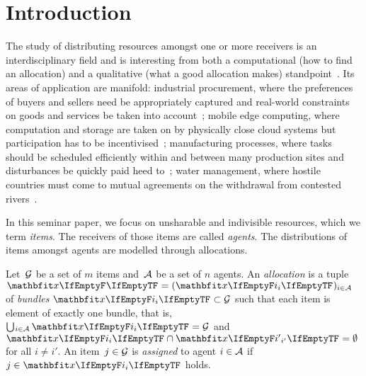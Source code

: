 \section{Introduction}
\label{sec:intro}

The study of distributing resources amongst one or more receivers is an interdisciplinary field and is interesting from both a computational (how to find an allocation) and a qualitative (what a good allocation makes) standpoint~\cite{survey}.
Its areas of application are mani\-fold:
industrial procurement, where the preferences of buyers and sellers need be appropriately captured and real-world constraints on goods and services be taken into account~\cite{survey};
mobile edge computing, where computation and storage are taken on by physically close cloud systems but participation has to be incentivised~\cite{edge_computing_auction, edge_computing_report};
manufacturing processes, where tasks should be scheduled efficiently within and between many production sites and disturbances be quickly paid heed to~\cite{survey};
water management, where hostile countries must come to mutual agreements on the withdrawal from contested rivers~\cite{water_management}.

In this seminar paper, we focus on unsharable and indivisible resources, which we term \emph{items}.
The receivers of those items are called \emph{agents}.
The distributions of items amongst agents are modelled through allocations.
\begin{definition}
	Let~\(\mathcal{G}\) be a set of \(m\) items and~\(\mathcal{A}\) be a set of \(n\) agents.
	An \emph{allocation} is a tuple \(\alloc[][] = (\alloc)_{i \in \agents}\) of \emph{bundles} \(\alloc \subset \goods\) such that each item is element of exactly one bundle, that is, \(\mathop{\bigcup\hspace{-1pt}_{i \in \agents}} \alloc = \goods\) and \(\alloc \cap \alloc[][i'] = \emptyset\) for all \(i \neq i'\).
	An item~\(j \in \mathcal{G}\) is \emph{assigned} to agent \(i \in \mathcal{A}\) if \(j \in \alloc\) holds.
\end{definition}

